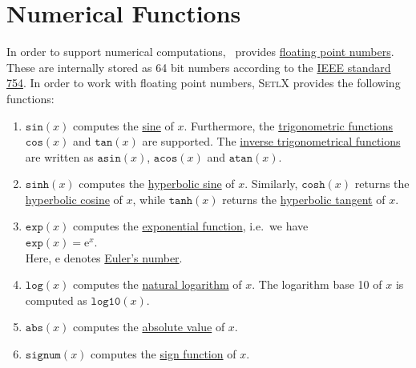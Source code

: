 \section{Numerical Functions}
In order to support numerical computations, \setlx\ provides
\href{https://en.wikipedia.org/wiki/Floating-point_arithmetic}{floating point numbers}.  These are internally
stored as 64 bit numbers according to the \href{https://en.wikipedia.org/wiki/IEEE_754}{IEEE standard 754}.  In
order to work with floating point numbers,  \textsc{SetlX} provides the following functions: 
\begin{enumerate}
\item $\texttt{sin}(x)$ computes the \href{https://en.wikipedia.org/wiki/Sine}{sine} of $x$.
      Furthermore, the \href{https://en.wikipedia.org/wiki/Trigonometric_functions}{trigonometric functions}
      $\texttt{cos}(x)$ and $\texttt{tan}(x)$ are supported.  The 
      \href{https://en.wikipedia.org/wiki/Inverse_trigonometric_functions}{inverse trigonometrical functions}
      are written as $\texttt{asin}(x)$, $\texttt{acos}(x)$ and $\texttt{atan}(x)$.    
\item $\texttt{sinh}(x)$ computes the \href{https://en.wikipedia.org/wiki/Hyperbolic_function}{hyperbolic sine} of $x$.
       Similarly,  $\mathtt{cosh}(x)$ returns the
       \href{https://en.wikipedia.org/wiki/Hyperbolic_function#Hyperbolic_cosine}{hyperbolic cosine} of $x$, while
      $\mathtt{tanh}(x)$ returns the
      \href{https://en.wikipedia.org/wiki/Hyperbolic_function#Hyperbolic_tangent}{hyperbolic tangent} of $x$. 
\item $\texttt{exp}(x)$ computes the \href{https://en.wikipedia.org/wiki/Exponential_function}{exponential
      function}, i.e.~we have 
      \\[0.2cm]
      \hspace*{1.3cm}
      $\texttt{exp}(x) = \mathrm{e}^x$.
      \\[0.2cm]
      Here, $\mathrm{e}$ denotes \href{https://en.wikipedia.org/wiki/E_(mathematical_constant)}{Euler's number}.
\item $\texttt{log}(x)$ computes the \href{https://en.wikipedia.org/wiki/Natural_logarithm}{natural logarithm} of  $x$.
      The logarithm base 10 of $x$ is computed as $\mathtt{log10}(x)$.
\item $\texttt{abs}(x)$ computes the \href{https://en.wikipedia.org/wiki/Absolute_value}{absolute value} of $x$.
\item $\mathtt{signum}(x)$ computes the \href{https://en.wikipedia.org/wiki/Sign_function}{sign function} of $x$.

\end{enumerate}

